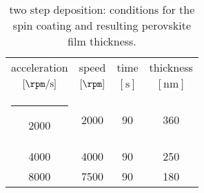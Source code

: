 		\begin{table}%
			\caption{ two step deposition: conditions for the  spin coating and resulting perovskite film thickness.}\label{mapi_thickness}
			\begin{center}
				\begin{tabular}{c c c | c}
					acceleration        & speed         & time        & thickness    \\
					$[\si{\rpm\per\s}]$ & $[\si{\rpm}]$ & $[\si{\s}]$ & $[\si{\nm}]$ \\[1mm]
					\hline
					\rule[0ex]{-4pt}{3ex}
					2000                & 2000          & 90          & 360          \\
					4000                & 4000          & 90          & 250          \\
					8000                & 7500          & 90          & 180          \\
				\end{tabular}
			\end{center}
		\end{table}

